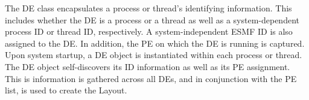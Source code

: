 
The DE class encapsulates a process or thread's identifying information.  This
includes whether the DE is a process or a thread as well as a system-dependent
process ID or thread ID, respectively.  A system-independent ESMF ID is also
assigned to the DE.  In addition, the PE on which the DE is running is
captured.  Upon system startup, a DE object is instantiated within each process
or thread.  The DE object self-discovers its ID information as well as its PE
assignment.  This is information is gathered across all DEs, and in
conjunction with the PE list, is used to create the Layout.
